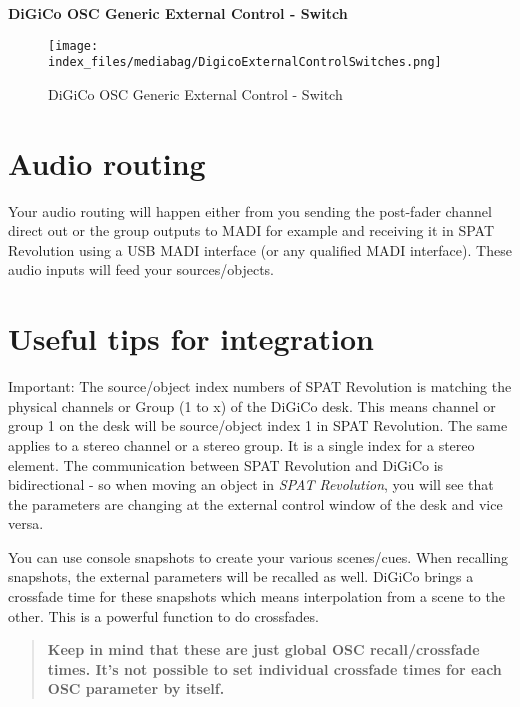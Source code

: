 \documentclass[
  letterpaper,
  DIV=11,
  numbers=noendperiod]{scrreport}
\begin{document}
\textbf{DiGiCo OSC Generic External Control - Switch}

\begin{figure}

{\centering \texttt{[image: index\_files/mediabag/DigicoExternalControlSwitches.png]}

}

\caption{DiGiCo OSC Generic External Control - Switch}

\end{figure}

\hypertarget{audio-routing}{%
\section{Audio routing}\label{audio-routing}}

Your audio routing will happen either from you sending the post-fader
channel direct out or the group outputs to MADI for example and
receiving it in SPAT Revolution using a USB MADI interface (or any
qualified MADI interface). These audio inputs will feed your
sources/objects.

\hypertarget{useful-tips-for-integration}{%
\section{Useful tips for
integration}\label{useful-tips-for-integration}}

Important: The source/object index numbers of SPAT Revolution is
matching the physical channels or Group (1 to x) of the DiGiCo desk.
This means channel or group 1 on the desk will be source/object index 1
in SPAT Revolution. The same applies to a stereo channel or a stereo
group. It is a single index for a stereo element. The communication
between SPAT Revolution and DiGiCo is bidirectional - so when moving an
object in \emph{SPAT Revolution}, you will see that the parameters are
changing at the external control window of the desk and vice versa.

You can use console snapshots to create your various scenes/cues. When
recalling snapshots, the external parameters will be recalled as well.
DiGiCo brings a crossfade time for these snapshots which means
interpolation from a scene to the other. This is a powerful function to
do crossfades.

\begin{quote}
\textbf{Keep in mind that these are just global OSC recall/crossfade
times. It's not possible to set individual crossfade times for each OSC
parameter by itself.}
\end{quote}
\end{document}
